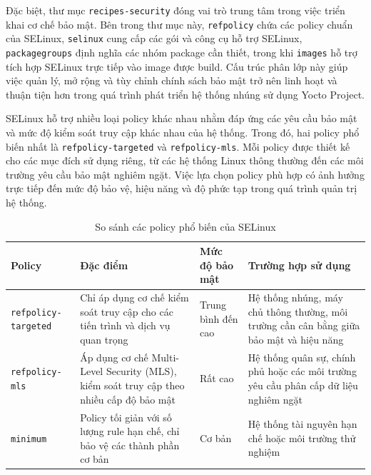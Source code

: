 Đặc biệt, thư mục \texttt{recipes-security} đóng vai trò trung tâm trong việc triển khai cơ chế bảo mật. Bên trong thư mục này, \texttt{refpolicy} chứa các policy chuẩn của SELinux, \texttt{selinux} cung cấp các gói và công cụ hỗ trợ SELinux, \texttt{packagegroups} định nghĩa các nhóm package cần thiết, trong khi \texttt{images} hỗ trợ tích hợp SELinux trực tiếp vào image được build. Cấu trúc phân lớp này giúp việc quản lý, mở rộng và tùy chỉnh chính sách bảo mật trở nên linh hoạt và thuận tiện hơn trong quá trình phát triển hệ thống nhúng sử dụng Yocto Project.

SELinux hỗ trợ nhiều loại policy khác nhau nhằm đáp ứng các yêu cầu bảo mật và mức độ kiểm soát truy cập khác nhau của hệ thống. Trong đó, hai policy phổ biến nhất là \texttt{refpolicy-targeted} và \texttt{refpolicy-mls}. Mỗi policy được thiết kế cho các mục đích sử dụng riêng, từ các hệ thống Linux thông thường đến các môi trường yêu cầu bảo mật nghiêm ngặt. Việc lựa chọn policy phù hợp có ảnh hưởng trực tiếp đến mức độ bảo vệ, hiệu năng và độ phức tạp trong quá trình quản trị hệ thống.

\begin{table}[H]
\centering
\caption{So sánh các policy phổ biến của SELinux}
\label{tab:selinux-policy-comparison}

\renewcommand{\arraystretch}{1.4}

\begin{tabular}{|p{4cm}|p{3.5cm}|p{3cm}|p{4cm}|}
\hline
\textbf{Policy} & \textbf{Đặc điểm} & \textbf{Mức độ bảo mật} & \textbf{Trường hợp sử dụng} \\ \hline

\texttt{refpolicy-targeted}
&
Chỉ áp dụng cơ chế kiểm soát truy cập cho các tiến trình và dịch vụ quan trọng
&
Trung bình đến cao
&
Hệ thống nhúng, máy chủ thông thường, môi trường cần cân bằng giữa bảo mật và hiệu năng
\\ \hline

\texttt{refpolicy-mls}
&
Áp dụng cơ chế Multi-Level Security (MLS), kiểm soát truy cập theo nhiều cấp độ bảo mật
&
Rất cao
&
Hệ thống quân sự, chính phủ hoặc các môi trường yêu cầu phân cấp dữ liệu nghiêm ngặt
\\ \hline

\texttt{minimum}
&
Policy tối giản với số lượng rule hạn chế, chỉ bảo vệ các thành phần cơ bản
&
Cơ bản
&
Hệ thống tài nguyên hạn chế hoặc môi trường thử nghiệm
\\ \hline

\end{tabular}
\end{table}

